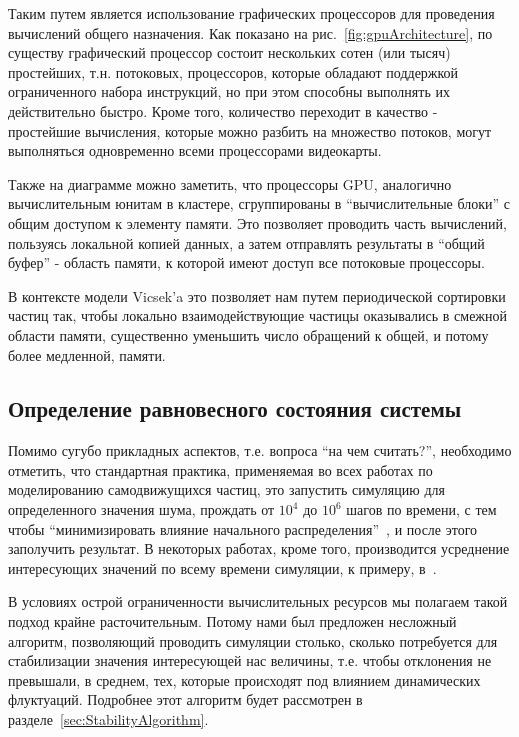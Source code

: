         Таким путем является использование графических процессоров для проведения вычислений общего назначения. Как показано на рис.~\ref{fig:gpuArchitecture}, по существу графический процессор состоит нескольких сотен (или тысяч) простейших, т.н. потоковых, процессоров, которые обладают поддержкой ограниченного набора инструкций, но при этом способны выполнять их действительно быстро. Кроме того, количество переходит в качество - простейшие вычисления, которые можно разбить на множество потоков, могут выполняться одновременно всеми процессорами видеокарты.

        Также на диаграмме можно заметить, что процессоры GPU, аналогично вычислительным юнитам в кластере, сгруппированы в ``вычислительные блоки'' с общим доступом к элементу памяти. Это позволяет проводить часть вычислений, пользуясь локальной копией данных, а затем отправлять результаты в ``общий буфер'' - область памяти, к которой имеют доступ все потоковые процессоры.

        В контексте модели Vicsek'a это позволяет нам путем периодической сортировки частиц так, чтобы локально взаимодействующие частицы оказывались в смежной области памяти, существенно уменьшить число обращений к общей, и потому более медленной, памяти.

    \subsection{Определение равновесного состояния системы} %
    \label{sub:EquilibriumState}
        Помимо сугубо прикладных аспектов, т.е. вопроса ``на чем считать?'', необходимо отметить, что стандартная практика, применяемая во всех работах по моделированию самодвижущихся частиц, это запустить симуляцию для определенного значения шума, прождать от $10^{4}$ до $10^{6}$ шагов по времени, с тем чтобы ``минимизировать влияние начального распределения''~\cite{huepe2008}, и после этого заполучить результат. В некоторых работах, кроме того, производится усреднение интересующих значений по всему времени симуляции, к примеру, в~\cite{gregoire2004}.

        В условиях острой ограниченности вычислительных ресурсов мы полагаем такой подход крайне расточительным. Потому нами был предложен несложный алгоритм, позволяющий проводить симуляции столько, сколько потребуется для стабилизации значения интересующей нас величины, т.е. чтобы отклонения не превышали, в среднем, тех, которые происходят под влиянием динамических флуктуаций. Подробнее этот алгоритм будет рассмотрен в разделе~\ref{sec:StabilityAlgorithm}.
